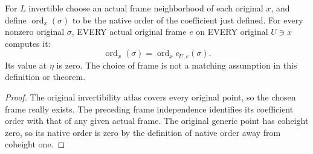 \begin{definition}
\label{def:curve-generic-section-original-order}
\leanok
{}
For $L$ invertible choose an actual frame neighborhood of each original
$x$, and define $\operatorname{ord}_x(\sigma)$ to be the native order of
the coefficient just defined.  For every nonzero original $\sigma$,
EVERY actual original frame $e$ on EVERY original $U\ni x$ computes it:
\[
 \operatorname{ord}_x(\sigma)=\operatorname{ord}_x c_{U,e}(\sigma).
\]
Its value at $\eta$ is zero.  The choice of frame is not a matching
assumption in this definition or theorem.
\end{definition}
\begin{proof}
The original invertibility atlas covers every original point, so
the chosen frame really exists.  The preceding frame independence
identifies its coefficient order with that of any given actual frame.
The original generic point has coheight zero, so its native order is
zero by the definition of native order away from coheight one.
\end{proof}

